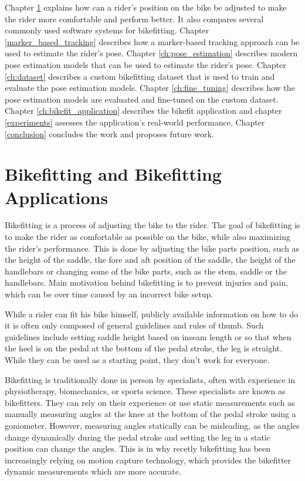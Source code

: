 Chapter \ref{bikefit} explains how can a rider's position on the bike be adjusted to make the rider more comfortable and perform better. It also compares several commonly used software systems for bikefitting. Chapter \ref{marker_based_tracking} describes how a marker-based tracking approach can be used to estimate the rider's pose. Chapter \ref{ch:pose_estimation} describes modern pose estimation models that can be used to estimate the rider's pose. Chapter \ref{ch:dataset} describes a custom bikefitting dataset that is used to train and evaluate the pose estimation models. Chapter \ref{ch:fine_tuning} describes how the pose estimation models are evaluated and fine-tuned on the custom dataset. Chapter \ref{ch:bikefit_application} describes the bikefit application and chapter \ref{experiments} assesses the application's real-world performance. Chapter \ref{conclusion} concludes the work and proposes future work.


\chapter{Bikefitting and Bikefitting Applications}
\label{bikefit}
Bikefitting is a process of adjusting the bike to the rider. The goal of bikefitting is to make the rider as comfortable as possible on the bike, while also maximizing the rider's performance. This is done by adjusting the bike parts position, such as the height of the saddle, the fore and aft position of the saddle, the height of the handlebars or changing some of the bike parts, such as the stem, saddle or the handlebars. Main motivation behind bikefitting is to prevent injuries and pain, which can be over time caused by an incorrect bike setup.

While a rider can fit his bike himself, publicly available information on how to do it is often only composed of general guidelines and rules of thumb. Such guidelines include setting saddle height based on inseam length or so that when the heel is on the pedal at the bottom of the pedal stroke, the leg is straight. While they can be used as a starting point, they don't work for everyone.

Bikefitting is traditionally done in person by specialists, often with experience in physiotherapy, biomechanics, or sports science. These specialists are known as bikefitters. They can rely on their experience or use static measurements such as manually measuring angles at the knee at the bottom of the pedal stroke using a goniometer. However, measuring angles statically can be misleading, as the angles change dynamically during the pedal stroke and setting the leg in a static position can change the angles. This is in why recetly bikefitting has been increasingly relying on motion capture technology, which provides the bikefitter dynamic measurements which are more accurate.

